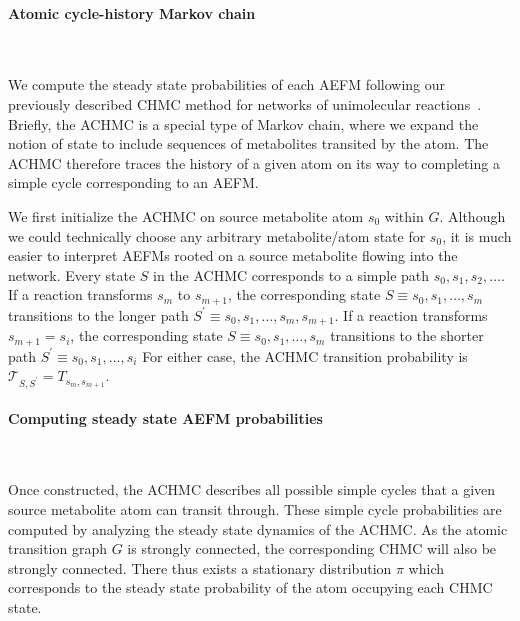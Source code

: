 \documentclass[12pt]{article}
\begin{document}
\paragraph*{Atomic cycle-history Markov chain}

\hspace*{0.1cm}\\\noindent

We compute the steady state probabilities of each AEFM following our
previously described CHMC method for networks of unimolecular
reactions~\citep{ChitpinJustinG2023AMct}. Briefly, the ACHMC is a special
type of Markov chain, where we expand the notion of state to include
sequences of metabolites transited by the atom. The ACHMC therefore traces
the history of a given atom on its way to completing a simple cycle
corresponding to an AEFM.

We first initialize the ACHMC on source metabolite atom $s_0$ within
$G$. Although we could technically choose any arbitrary metabolite/atom
state for $s_0$, it is much easier to interpret AEFMs rooted on
a source metabolite flowing into the network. Every state $S$ in the ACHMC
corresponds to a simple path $s_0, s_1, s_2, \ldots$. If a reaction
transforms $s_m$ to $s_{m+1}$, the corresponding state $S \equiv s_0, s_1,
\ldots, s_m$ transitions to the longer path $S^{\prime} \equiv s_0, s_1,
\ldots, s_m, s_{m+1}$. If a reaction transforms $s_{m+1} = s_i$, the
corresponding state $S \equiv s_0, s_1,\ldots, s_m$ transitions to the
shorter path $S^{\prime} \equiv s_0, s_1, \ldots, s_i$ For either case,
the ACHMC transition probability is $\mathcal{T}_{S,S^{\prime}}
= T_{s_m,s_{m+1}}$.

\paragraph*{Computing steady state AEFM probabilities}

\hspace*{0.1cm}\\\noindent

Once constructed, the ACHMC describes all possible simple cycles that
a given source metabolite atom can transit through. These simple cycle
probabilities are computed by analyzing the steady state dynamics of the
ACHMC. As the atomic transition graph $G$ is strongly connected, the
corresponding CHMC will also be strongly connected. There thus exists
a stationary distribution $\pi$ which corresponds to the steady state
probability of the atom occupying each CHMC state.
\end{document}
